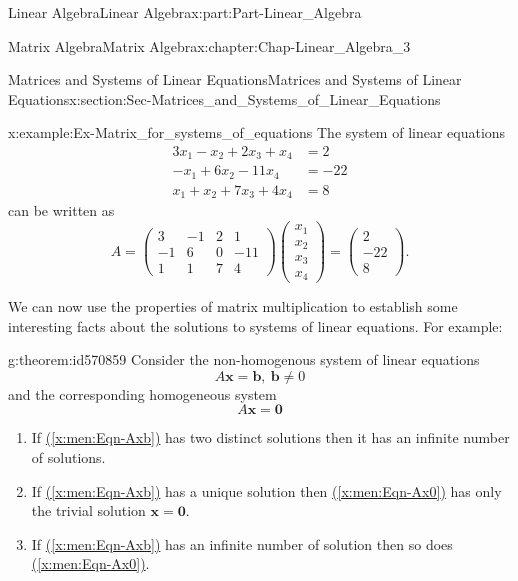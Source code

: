 \documentclass[oneside,10pt,]{book}
\newcommand{\xreffont}{\relax}
\numberwithin{equation}{section}
\newcommand{\amp}{&}
\begin{document}
\begin{partptx}{Linear Algebra}{}{Linear Algebra}{}{}{x:part:Part-Linear_Algebra}
\begin{chapterptx}{Matrix Algebra}{}{Matrix Algebra}{}{}{x:chapter:Chap-Linear_Algebra_3}
\begin{sectionptx}{Matrices and Systems of Linear Equations}{}{Matrices and Systems of Linear Equations}{}{}{x:section:Sec-Matrices_and_Systems_of_Linear_Equations}
\begin{example}{}{x:example:Ex-Matrix_for_systems_of_equations}
The system of linear equations%
\begin{align*}
3x_1 - x_2 + 2x_3 + x_4  \amp= 2\\
-x_1 + 6x_2 - 11x_4  \amp= -22\\
x_1 + x_2 + 7x_3 + 4x_4  \amp= 8
\end{align*}
can be written as%
\begin{equation*}
A = \begin{pmatrix} 3 \amp -1 \amp 2 \amp 1 \\ -1 \amp 6 \amp 0 \amp -11 \\ 1 \amp 1 \amp 7 \amp 4 \end{pmatrix} \begin{pmatrix}x_1\\ x_2 \\ x_3 \\ x_4\end{pmatrix} = \begin{pmatrix} 2 \\ -22 \\ 8\end{pmatrix}.
\end{equation*}
%
\end{example}
We can now use the properties of matrix multiplication to establish some interesting facts about the solutions to systems of linear equations. For example:%
\begin{theorem}{}{}{g:theorem:id570859}%
Consider the non-homogenous system of linear equations%
\begin{equation}
A\mathbf{x} = \mathbf{b}, \ \mathbf{b} \neq 0\label{x:men:Eqn-Axb}
\end{equation}
and the corresponding homogeneous system%
\begin{equation}
A\mathbf{x} = \mathbf{0}\label{x:men:Eqn-Ax0}
\end{equation}
%
\begin{enumerate}[label=(\arabic*)]
\item{}If \hyperref[x:men:Eqn-Axb]{({\xreffont\ref{x:men:Eqn-Axb}})} has two distinct solutions then it has an infinite number of solutions.%
\item{}If \hyperref[x:men:Eqn-Axb]{({\xreffont\ref{x:men:Eqn-Axb}})} has a unique solution then \hyperref[x:men:Eqn-Ax0]{({\xreffont\ref{x:men:Eqn-Ax0}})} has only the trivial solution \(\mathbf{x}=\mathbf{0}\).%
\item{}If \hyperref[x:men:Eqn-Axb]{({\xreffont\ref{x:men:Eqn-Axb}})}  has an infinite number of solution then so does \hyperref[x:men:Eqn-Ax0]{({\xreffont\ref{x:men:Eqn-Ax0}})}.%

\end{enumerate}
\end{theorem}
\end{sectionptx}
\end{chapterptx}
\end{partptx}
\end{document}
